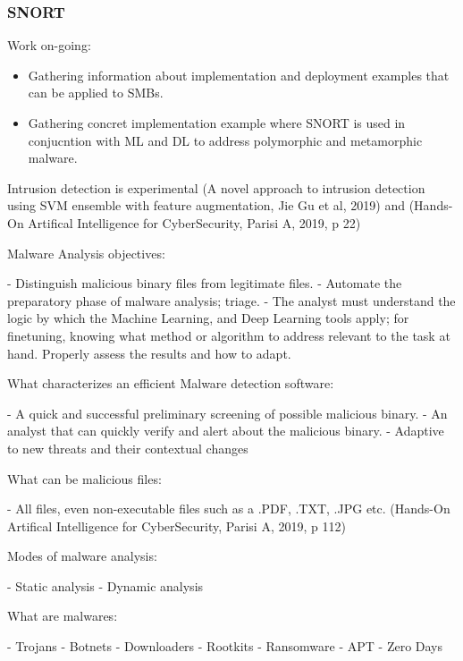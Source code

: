 \subsubsection{SNORT}

\begin{notes}

    Work on-going:

    \begin{itemize}
        \item Gathering information about implementation and deployment examples that can be applied to SMBs.
        \item Gathering concret implementation example where SNORT is used in conjucntion with ML and DL to address polymorphic and metamorphic malware.\\
    \end{itemize}
    
\end{notes}


Intrusion detection is experimental (A novel approach to intrusion detection using
SVM ensemble with feature augmentation, Jie Gu et al, 2019) and (Hands-On Artifical Intelligence for CyberSecurity, Parisi A, 2019, p 22)


Malware Analysis objectives:

- Distinguish malicious binary files from legitimate files.
- Automate the preparatory phase of malware analysis; triage.
- The analyst must understand the logic by which the Machine Learning, and Deep Learning tools apply; for finetuning, knowing what method or algorithm to address relevant to the task at hand. Properly assess the results and how to adapt.

What characterizes an efficient Malware detection software:

- A quick and successful preliminary screening of possible malicious binary.
- An analyst that can quickly verify and alert about the malicious binary.
- Adaptive to new threats and their contextual changes

What can be malicious files:

- All files, even non-executable files such as a .PDF, .TXT, .JPG etc. (Hands-On Artifical Intelligence for CyberSecurity, Parisi A, 2019, p 112)

Modes of malware analysis:

- Static analysis
- Dynamic analysis


What are malwares:

- Trojans
- Botnets
- Downloaders
- Rootkits
- Ransomware
- APT
- Zero Days